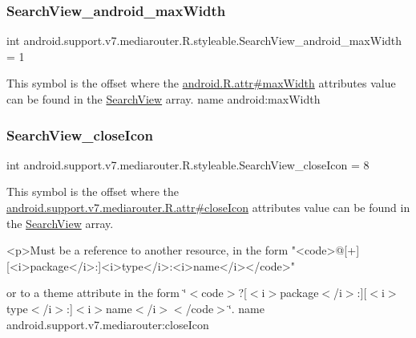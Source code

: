 \subsubsection{\texorpdfstring{Search\+View\+\_\+android\+\_\+max\+Width}{SearchView\_android\_maxWidth}}
{\footnotesize\ttfamily int android.\+support.\+v7.\+mediarouter.\+R.\+styleable.\+Search\+View\+\_\+android\+\_\+max\+Width = 1\hspace{0.3cm}{\ttfamily [static]}}

This symbol is the offset where the \hyperlink{}{android.\+R.\+attr\#max\+Width} attribute\textquotesingle{}s value can be found in the \hyperlink{classandroid_1_1support_1_1v7_1_1mediarouter_1_1R_1_1styleable_a5573e3195bf93122a37c69394418c7d7}{Search\+View} array.  name android\+:max\+Width \mbox{\label{classandroid_1_1support_1_1v7_1_1mediarouter_1_1R_1_1styleable_adc953a78777a6f78846028fcb3c7c1aa}} 
\subsubsection{\texorpdfstring{Search\+View\+\_\+close\+Icon}{SearchView\_closeIcon}}
{\footnotesize\ttfamily int android.\+support.\+v7.\+mediarouter.\+R.\+styleable.\+Search\+View\+\_\+close\+Icon = 8\hspace{0.3cm}{\ttfamily [static]}}

This symbol is the offset where the \hyperlink{classandroid_1_1support_1_1v7_1_1mediarouter_1_1R_1_1attr_a76b39c93a184c1a2483ee9999d1613db}{android.\+support.\+v7.\+mediarouter.\+R.\+attr\#close\+Icon} attribute\textquotesingle{}s value can be found in the \hyperlink{classandroid_1_1support_1_1v7_1_1mediarouter_1_1R_1_1styleable_a5573e3195bf93122a37c69394418c7d7}{Search\+View} array.

\begin{DoxyVerb}      <p>Must be a reference to another resource, in the form "<code>@[+][<i>package</i>:]<i>type</i>:<i>name</i></code>"
\end{DoxyVerb}
 or to a theme attribute in the form \char`\"{}$<$code$>$?\mbox{[}$<$i$>$package$<$/i$>$\+:\mbox{]}\mbox{[}$<$i$>$type$<$/i$>$\+:\mbox{]}$<$i$>$name$<$/i$>$$<$/code$>$\char`\"{}.  name android.\+support.\+v7.\+mediarouter\+:close\+Icon \mbox{\label{classandroid_1_1support_1_1v7_1_1mediarouter_1_1R_1_1styleable_ae0021e7caae5581aab60a4f50e79af40}} 
